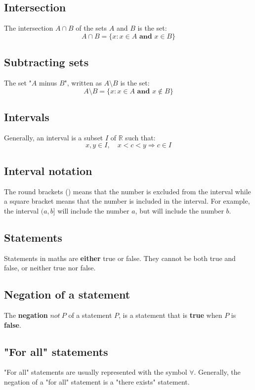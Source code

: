 \documentclass[11pt]{article}
\begin{document}
\subsection{Intersection}
\label{sec:org42c9483}
The intersection \(A \cap B\) of the sets \(A\) and \(B\) is the set:
\[A \cap B = \{x : x \in A \textbf{ and } x \in B\}\]

\subsection{Subtracting sets}
\label{sec:org94a7f9d}
The set "\(A\) minus \(B\)", written as \(A \setminus B\) is the set:
\[A \setminus B = \{x : x \in A \textbf{ and } x \notin B\}\]

\subsection{Intervals}
\label{sec:org6efdfba}
Generally, an interval is a subset \(I\) of \(\mathbb{R}\) such that:
\[x, y \in I, \quad x < c < y \Rightarrow c \in I\]

\subsection{Interval notation}
\label{sec:org9641510}
The round brackets () means that the number is excluded from the interval while a square bracket means that the number is included in the interval. For example, the interval \((a, b]\) will include the number \(a\), but will include the number \(b\).

\subsection{Statements}
\label{sec:orgfe3ae19}
Statements in maths are \textbf{either} true or false. They cannot be both true and false, or neither true nor false.

\subsection{Negation of a statement}
\label{sec:orgec4c987}
The \textbf{negation} \(not \ P\) of a statement \(P\), is a statement that is \textbf{true} when \(P\) is \textbf{false}.

\subsection{"For all" statements}
\label{sec:orgde7a695}
"For all" statements are usually represented with the symbol \(\forall\). Generally, the negation of a "for all" statement is a "there exists" statement.
\end{document}

